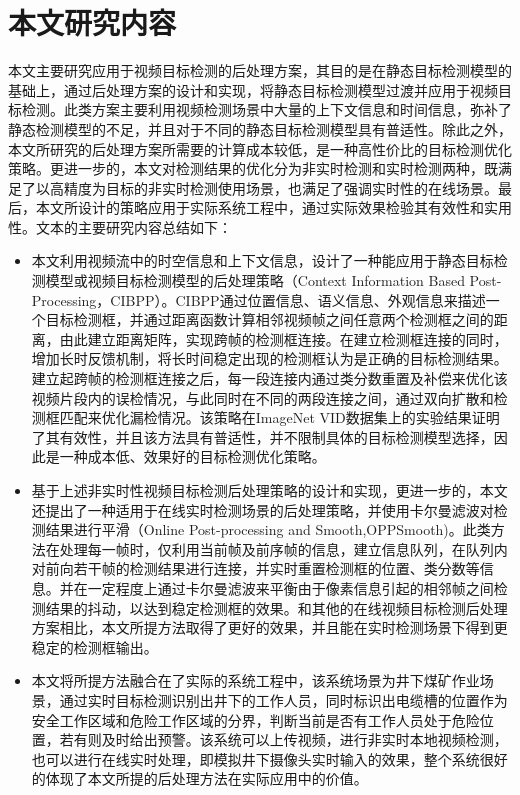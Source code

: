 \documentclass[winfonts,master,twoside,AutoFakeBold= {2}]{njuthesis}
\begin{document}
\section{本文研究内容}
本文主要研究应用于视频目标检测的后处理方案，其目的是在静态目标检测模型的基础上，通过后处理方案的设计和实现，将静态目标检测模型过渡并应用于视频目标检测。此类方案主要利用视频检测场景中大量的上下文信息和时间信息，弥补了静态检测模型的不足，并且对于不同的静态目标检测模型具有普适性。除此之外，本文所研究的后处理方案所需要的计算成本较低，是一种高性价比的目标检测优化策略。更进一步的，本文对检测结果的优化分为非实时检测和实时检测两种，既满足了以高精度为目标的非实时检测使用场景，也满足了强调实时性的在线场景。最后，本文所设计的策略应用于实际系统工程中，通过实际效果检验其有效性和实用性。文本的主要研究内容总结如下：
\begin{itemize}
\item 本文利用视频流中的时空信息和上下文信息，设计了一种能应用于静态目标检测模型或视频目标检测模型的后处理策略（Context Information Based Post-Processing，CIBPP）。CIBPP通过位置信息、语义信息、外观信息来描述一个目标检测框，并通过距离函数计算相邻视频帧之间任意两个检测框之间的距离，由此建立距离矩阵，实现跨帧的检测框连接。在建立检测框连接的同时，增加长时反馈机制，将长时间稳定出现的检测框认为是正确的目标检测结果。建立起跨帧的检测框连接之后，每一段连接内通过类分数重置及补偿来优化该视频片段内的误检情况，与此同时在不同的两段连接之间，通过双向扩散和检测框匹配来优化漏检情况。该策略在ImageNet VID数据集上的实验结果证明了其有效性，并且该方法具有普适性，并不限制具体的目标检测模型选择，因此是一种成本低、效果好的目标检测优化策略。
\item 基于上述非实时性视频目标检测后处理策略的设计和实现，更进一步的，本文还提出了一种适用于在线实时检测场景的后处理策略，并使用卡尔曼滤波对检测结果进行平滑（Online Post-processing and Smooth,OPPSmooth)。此类方法在处理每一帧时，仅利用当前帧及前序帧的信息，建立信息队列，在队列内对前向若干帧的检测结果进行连接，并实时重置检测框的位置、类分数等信息。并在一定程度上通过卡尔曼滤波来平衡由于像素信息引起的相邻帧之间检测结果的抖动，以达到稳定检测框的效果。和其他的在线视频目标检测后处理方案相比，本文所提方法取得了更好的效果，并且能在实时检测场景下得到更稳定的检测框输出。
\item 本文将所提方法融合在了实际的系统工程中，该系统场景为井下煤矿作业场景，通过实时目标检测识别出井下的工作人员，同时标识出电缆槽的位置作为安全工作区域和危险工作区域的分界，判断当前是否有工作人员处于危险位置，若有则及时给出预警。该系统可以上传视频，进行非实时本地视频检测，也可以进行在线实时处理，即模拟井下摄像头实时输入的效果，整个系统很好的体现了本文所提的后处理方法在实际应用中的价值。
\end{itemize}
\end{document}

